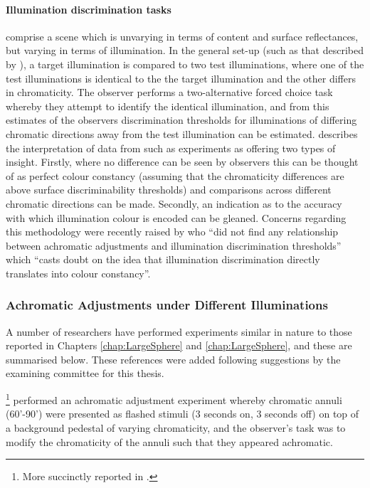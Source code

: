 \paragraph{Illumination discrimination tasks} comprise a scene which is unvarying in terms of content and surface reflectances, but varying in terms of illumination. In the general set-up (such as that described by \citet{pearce_chromatic_2014}), a target illumination is compared to two test illuminations, where one of the test illuminations is identical to the the target illumination and the other differs in chromaticity. The observer performs a two-alternative forced choice task whereby they attempt to identify the identical illumination, and from this estimates of the observers discrimination thresholds for illuminations of differing chromatic directions away from the test illumination can be estimated. \citet{aston_illumination_2019} describes the interpretation of data from such as experiments as offering two types of insight. Firstly, where no difference can be seen by observers this can be thought of as perfect colour constancy (assuming that the chromaticity differences are above surface discriminability thresholds) and comparisons across different chromatic directions can be made. Secondly, an indication as to the accuracy with which illumination colour is encoded can be gleaned. Concerns regarding this methodology were recently raised by \citet{weiss_determinants_2017} who ``did not find any relationship between achromatic adjustments and illumination discrimination thresholds'' which ``casts doubt on the idea that illumination discrimination directly translates into colour constancy''.

\subsubsection{Achromatic Adjustments under Different Illuminations} \label{sec:aadi}

A number of researchers have performed experiments similar in nature to those reported in Chapters \ref{chap:LargeSphere} and \ref{chap:LargeSphere}, and these are summarised below. These references were added following suggestions by the examining committee for this thesis.

\textbf{\citet{werner_effect_1982}}\footnote{More succinctly reported in \citet{walraven_chromatic_1982}.} performed an achromatic adjustment experiment whereby chromatic annuli (60'-90') were presented as flashed stimuli (3 seconds on, 3 seconds off) on top of a background pedestal of varying chromaticity, and the observer's task was to modify the chromaticity of the annuli such that they appeared achromatic. 

